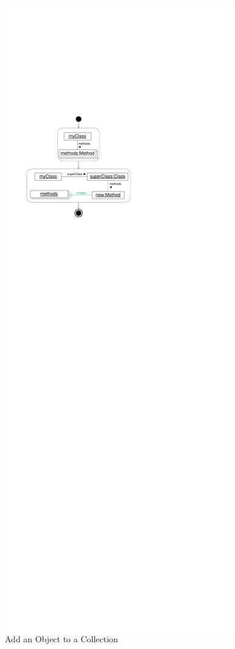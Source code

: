 \begin{figure}[htb]
\begin{minipage}{.47\textwidth}
		\includegraphics[width=\linewidth]{figures/InclusionLinksExample1}
    \caption{Add an Object to a Collection}
    \label{fig:InclusionLinksExample1}
	\end{minipage}
\end{figure}

